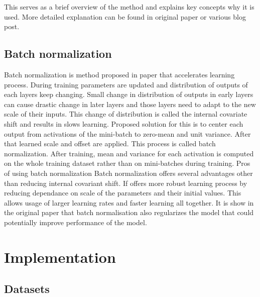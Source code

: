 \documentclass[times, utf8, diplomski, numeric, english]{fer}
\begin{document}
This serves as a brief overview of the method and explains key concepts why it is used. More detailed explanation can be found in original paper\cite{Graves:2006:CTC:1143844.1143891} or various blog post\cite{ctc-blog}.

\section{Batch normalization}
Batch normalization is method proposed in paper\cite{BNORM} that accelerates learning process. 
During training parameters are updated and distribution of outputs of each layers keep changing. Small change in distribution of outputs in early layers can cause drastic change in later layers and those layers need to adapt to the new scale of their inputs. This change of distribution is called the internal covariate shift and results in slows learning.
Proposed solution for this is to center each output from activations of the mini-batch to zero-mean and unit variance. After that learned scale and offset are applied. This process is called batch normalization. 
After training, mean and variance for each activation is computed on the whole training dataset rather than on mini-batches during training. 
Pros of using batch normalization 
Batch normalization offers several advantages other than reducing internal covariant shift. 
If offers more robust learning process by reducing dependance on scale of the parameters and their initial values. This allows usage of larger learning rates and faster learning all together. It is show in the original paper that batch normalisation also regularizes the model that could potentially improve performance of the model.

\chapter{Implementation}

\section{Datasets}
\end{document}

